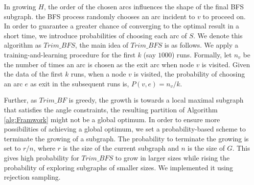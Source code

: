 In growing $H$, the order of the chosen arcs influences the shape of the final BFS subgraph. the BFS process randomly chooses an arc incident to $v$ to proceed on. In order to guarantee a greater chance of converging to the optimal result in a short time, we introduce probabilities of choosing each arc of $S$. We denote this algorithm as \textbf{$Trim\_BFS$}, the main idea of $Trim\_BFS$ is as follows.
We apply a training-and-learning procedure for the first $k$ (say $1000$) runs. Formally, let $n_v$ be the number of times an arc is chosen as the exit arc when node $v$ is visited. Given the data of the first $k$ runs, when a node $v$ is visited, the probability of choosing an arc $e$ as exit in the subsequent runs is, $P(v, e) = n_v/k$.


Further, as $Trim\_BF$ is greedy, the growth is towards a local maximal subgraph that satisfies the angle constraints, the resulting partition of Algorithm \ref{alg:Framwork} might not be a global optimum. In order to ensure more possibilities of achieving a global optimum, we set a probability-based scheme to terminate the growing of a subgraph. The probability to terminate the growing is set to $r/n$, where $r$ is the size of the current subgraph and $n$ is the size of $G$. This gives high probability for $Trim\_BFS$ to grow in larger sizes while rising the probability of exploring subgraphs of smaller sizes. We implemented it using rejection sampling.

